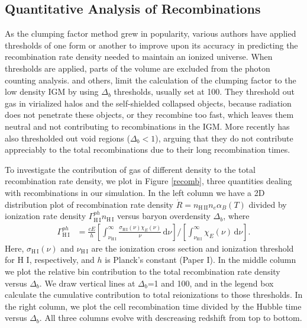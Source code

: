 \subsection{Quantitative Analysis of Recombinations}

As the clumping factor method grew in popularity, various authors have applied thresholds of one form or another to improve upon its accuracy in predicting the recombination rate density needed to maintain an ionized universe. When thresholds are applied, parts of the volume are excluded from the photon counting analysis.   \cite{PawlikEtAl2009, RaicevicTheuns2011} and others, limit the calculation of the clumping factor to the low density IGM by using $\Delta_b$ thresholds, usually set at 100.  They threshold out gas in virialized halos and the self-shielded collapsed objects, because radiation does not penetrate these objects, or they recombine too fast, which leaves them neutral and not contributing to recombinations in the IGM. More recently \cite{ShullEtAl2012} has also thresholded out void regions ($\Delta_b < 1$), arguing that they do not contribute appreciably to the total recombinations due to their long recombination times. 

To investigate the contribution of gas of different density to the total recombination rate density, we plot in Figure \ref{recomb}, three quantities dealing with recombinations in our simulation.  In the left column we have a 2D distribution plot of recombination rate density $\dot{R} = n_\mathrm{H\,II}n_e\alpha_B(T)$ divided by ionization rate density $\Gamma_\mathrm{H\,I}^{ph}n_\mathrm{H\,I}$ versus baryon overdensity $\Delta_b$, where  
\begin{align}
  \label{eq:photoionization}
  \Gamma_\mathrm{H\,I}^{ph} &= \frac{c E}{h} \left[\int_{\nu_\mathrm{H\,I}}^{\infty}
    \frac{\sigma_\mathrm{H\,I}(\nu) \chi_E(\nu)}{\nu}\,\mathrm d\nu \right]  \bigg /
  \left[\int_{\nu_\mathrm{H\,I}}^{\infty} \chi_E(\nu)\,\mathrm d\nu\right].
\end{align}
Here, $\sigma_\mathrm{H\,I}(\nu)$ and $\nu_\mathrm{H\,I}$ are the ionization cross section and ionization threshold for H {\footnotesize I}, respectively, and 
$h$ is Planck's constant (Paper I). In the middle column we plot the relative bin contribution to the total recombination rate density versus $\Delta_b$.  We draw vertical lines at $\Delta_b$=1 and 100, and in the legend box calculate the cumulative contribution to total reionizations to those thresholds.  In the right column, we plot the cell recombination time divided by the Hubble time versus $\Delta_b$.  All three columns evolve with descreasing redshift from top to bottom.

